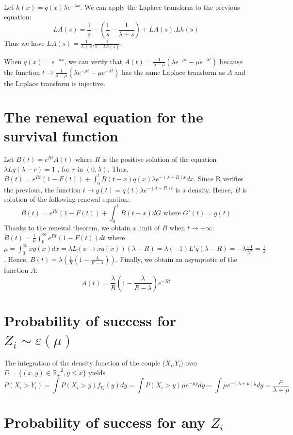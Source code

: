 \documentclass[12pt,twoside]{article}
\begin{document}
{Let $h(x) = q(x)\lambda e^{-\lambda x}$.
We can apply the Laplace transform to the previous equation:
$$LA(s) = \frac{1}{s} - (\frac{1}{s}-\frac{1}{\lambda+s}) + LA(s).Lh(s)$$ 
Thus we have 
$LA(s) = \frac{1}{\lambda+s}. \frac{1}{ 1-Lh(s)}$.


When $q(x) = e^{-\mu x}$, we can verify that $A(t) = \frac{1}{\lambda-\mu}(\lambda e^{-\mu t}-\mu e^{-\lambda t})$
because the function $t\rightarrow\frac{1}{\lambda-\mu}(\lambda e^{-\mu t}-\mu e^{-\lambda t})$ has the same Laplace transform
as $A$ and the Laplace transform is injective.

\section{The renewal equation for the survival function }
\label{mod1_dem3}

Let $B(t) = e^{Rt} A(t)$ where $R$ is the positive solution of the equation $\lambda Lq(\lambda-r) =1$ , for $r$ in $(0,\lambda)$.
Thus, $B(t) = e^{Rt}(1-F(t))  + \int_0^t B(t-x)q(x)\lambda e^{-(\lambda-R) x} dx$. Since R verifies the previous,
the function $t\rightarrow g(t)=q(t)\lambda e^{-(\lambda-R) t} $ is a density. Hence, $B$ is solution of the following renewal equation:
$$
B(t) =  e^{Rt}(1-F(t))  + \int_0^t B(t-x)dG \textrm{  where  }G'(t)=g(t)
$$
Thanks to the renewal theorem, we obtain a limit of $B$ when $t\rightarrow + \infty$:
$B(t)= \frac{1}{\mu} \int_0^{\infty} e^{Rt}(1-F(t))dt$ 
where $\mu=\int_0^{\infty}x g(x)dx = \lambda L(x\rightarrow x q(x))(\lambda-R) = \lambda (-1)L'q(\lambda-R) = -\lambda \frac{-1}{\lambda^2}=\frac{1}{\lambda}$.
Hence, $B(t)=\lambda (\frac{1}{R}(1-\frac{\lambda}{R-\lambda}))$. Finally, we obtain an asymptotic of the function $A$:
$$
A(t)= \frac{\lambda}{R}(1-\frac{\lambda}{R-\lambda}) e^{-Rt}
$$



\section{Probability of success for $Z_i \sim \varepsilon(\mu)$ }
\label{mod2_dem1}


The integration of the density function of the couple ($X_i$,$Y_i$) over $D= \{(x,y)\in \mathbb{R_+}^2,y\leq x\}$ yields
$$
P(X_i>Y_i)=\int P(X_i>y)f_{Y_i}(y) dy = \int P(X_i>y) \mu e^{-\mu y} dy=\int  \mu e^{-(\lambda+\mu) y} dy=\frac{\mu}{\lambda+\mu}
$$


\section{Probability of success for any $Z_i$}
\label{mod2_dem2}

}
\end{document}
